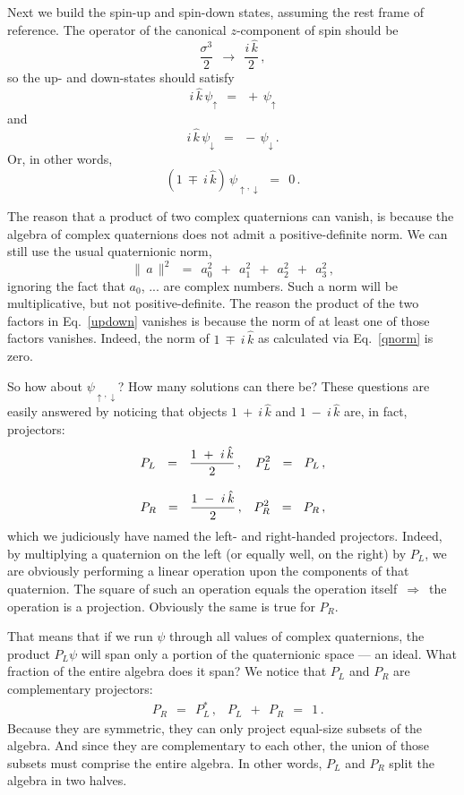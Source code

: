 \documentclass[epsfig,12pt]{article}
\newcommand{\kk}{\hat k}
\begin{document}
        Next we build the spin-up and spin-down states, assuming the rest frame of reference.
	The operator of the canonical $ z $-component of spin should be
\[
	\frac{\sigma^3} 2	~~\to~~		\frac{i\,\kk} 2\,,	
\]
	so the up- and down-states should satisfy
\begin{equation}
	i\,\kk\, \psi_\uparrow	~~=~~		+\,\psi_\uparrow
\end{equation}
	and
\begin{equation}
	i\,\kk\, \psi_\downarrow	~~=~~		-\,\psi_\downarrow\,.
\end{equation}
	Or, in other words,
\begin{equation}
\label{updown}
	(1 ~\mp~ i\,\kk)\, \psi_{\uparrow,\downarrow}	~~=~~	0\,.
\end{equation}

	The reason that a product of two complex quaternions can vanish, is because
	the algebra of complex quaternions does not admit a positive-definite norm.
	We can still use the usual quaternionic norm,
\begin{equation}
\label{qnorm}
	\|\,a\,\|^2	~~=~~	a_0^2  ~~+~~  a_1^2  ~~+~~  a_2^2  ~~+~~  a_3^2\,,
\end{equation}
	ignoring the fact that $ a_0 $, ... are complex numbers.
	Such a norm will be multiplicative, but not positive-definite.
	The reason the product of the two factors in Eq.~\eqref{updown} vanishes 
	is because the norm of at least one of those factors vanishes.
	Indeed, the norm of $ 1 ~\mp~ i\,\kk $ as calculated via Eq.~\eqref{qnorm} is zero.

	So how about $ \psi_{\uparrow,\downarrow} $? How many solutions can there be?
	These questions are easily answered by noticing that objects $ 1 ~+~ i\,\kk $ 
	and $ 1 ~-~ i\,\kk $ are, in fact, projectors:
\begin{align}
%
	\notag
	&
	P_L	~~=~~	\frac { 1 ~+~ i\,\kk } 2\,,
	&
	P_L^2	~~=~~	P_L\,,
	\\[3mm]
%	
	&
	P_R	~~=~~	\frac { 1 ~-~ i\,\kk } 2\,,
	&
	P_R^2	~~=~~	P_R\,,
\end{align}
	which we judiciously have named the left- and right-handed projectors.
	Indeed, by multiplying a quaternion on the left (or equally well, on the right) by $ P_L $,
	we are obviously performing a linear operation upon the components of that quaternion.
	The square of such an operation equals the operation itself $ \,\Rightarrow\, $
	the operation is a projection.
	Obviously the same is true for $ P_R $.

	That means that if we run $ \psi $ through all values of complex quaternions,
	the product $ P_L \psi $ will span only a portion of the quaternionic space
	--- an ideal.
	What fraction of the entire algebra does it span?
	We notice that $ P_L $ and $ P_R $ are complementary projectors:
\begin{align}
	&
	P_R	~~=~~	P_L^*\,,
	&
	P_L  ~~+~~  P_R		~~=~~	1\,.
\end{align}
	Because they are symmetric, they can only project equal-size subsets of the algebra.
	And since they are complementary to each other, the union of those subsets
	must comprise the entire algebra.
	In other words, $ P_L $ and $ P_R $ split the algebra in two halves.
\end{document}
